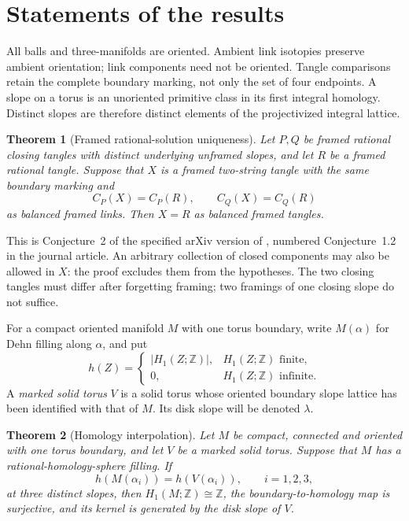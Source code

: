 \documentclass[11pt]{amsart}
\newtheorem{theorem}{Theorem}[section]
\theoremstyle{definition}
\theoremstyle{remark}
\newcommand{\Z}{\mathbb Z}
\newcommand{\cl}[2]{C_{#1}(#2)}
\begin{document}
\section{Statements of the results}\label{sec:statements}

All balls and three-manifolds are oriented. Ambient link isotopies
preserve ambient orientation; link components need not be oriented.
Tangle comparisons retain the complete boundary marking, not only
the set of four endpoints. A slope on a torus is an unoriented
primitive class in its first integral homology. Distinct slopes are
therefore distinct elements of the projectivized integral lattice.

\begin{theorem}[Framed rational-solution uniqueness]\label{thm:framed}
Let \(P,Q\) be framed rational closing tangles with distinct
underlying unframed slopes, and let \(R\) be a framed rational
tangle. Suppose that \(X\) is a framed two-string tangle with the
same boundary marking and
\[
 \cl P X=\cl P R,\qquad \cl Q X=\cl Q R
\]
as balanced framed links. Then \(X=R\) as balanced framed tangles.
\end{theorem}

This is Conjecture~2 of the specified arXiv version of
\cite{Sikora}, numbered Conjecture~1.2 in the journal article.
An arbitrary collection of closed components may also be allowed
in \(X\): the proof excludes them from the hypotheses.
The two closing tangles must differ after forgetting framing;
two framings of one closing slope do not suffice.

For a compact oriented manifold \(M\) with one torus boundary, write
\(M(\alpha)\) for Dehn filling along \(\alpha\), and put
\[
 h(Z)=
 \begin{cases}|H_1(Z;\Z)|,&H_1(Z;\Z)\text{ finite},\\
 0,&H_1(Z;\Z)\text{ infinite}.
 \end{cases}
\]
A \emph{marked solid torus} \(V\) is a solid torus whose oriented
boundary slope lattice has been identified with that of \(M\).
Its disk slope will be denoted \(\lambda\).

\begin{theorem}[Homology interpolation]\label{thm:homology}
Let \(M\) be compact, connected and oriented with one torus boundary,
and let \(V\) be a marked solid torus. Suppose that \(M\) has a
rational-homology-sphere filling. If
\[
 h(M(\alpha_i))=h(V(\alpha_i)),\qquad i=1,2,3,
\]
at three distinct slopes, then \(H_1(M;\Z)\cong\Z\), the
boundary-to-homology map is surjective, and its kernel is generated
by the disk slope of \(V\).
\end{theorem}
\end{document}
